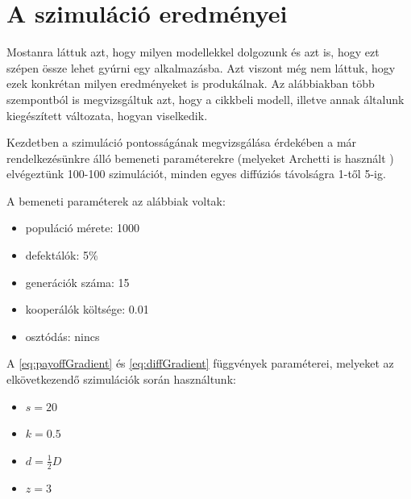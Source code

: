 
\chapter{A szimuláció eredményei}

Mostanra láttuk azt, hogy milyen modellekkel dolgozunk és azt is, hogy ezt szépen össze lehet gyúrni egy alkalmazásba. Azt viszont még nem láttuk, hogy ezek konkrétan milyen eredményeket is produkálnak. Az alábbiakban több szempontból is megvizsgáltuk azt, hogy a \cite{archetti2016cooperation} cikkbeli modell, illetve annak általunk kiegészített változata, hogyan viselkedik.

Kezdetben a szimuláció pontosságának megvizsgálása érdekében a már rendelkezésünkre álló bemeneti paraméterekre (melyeket Archetti is használt \cite{archetti2016cooperation}) elvégeztünk 100-100 szimulációt, minden egyes diffúziós távolságra 1-től 5-ig.

A bemeneti paraméterek az alábbiak voltak:
\begin{itemize}
	\item populáció mérete: 1000
	\item defektálók: 5\%
	\item generációk száma: 15
	\item kooperálók költsége: 0.01
	\item osztódás: nincs
\end{itemize}

A \eqref{eq:payoffGradient} és \eqref{eq:diffGradient} függvények paraméterei, melyeket az elkövetkezendő szimulációk során használtunk:
\begin{itemize}
	\item $s = 20$
	\item $k = 0.5$
	\item $d = \frac{1}{2}D$
	\item $z = 3$
\end{itemize}

